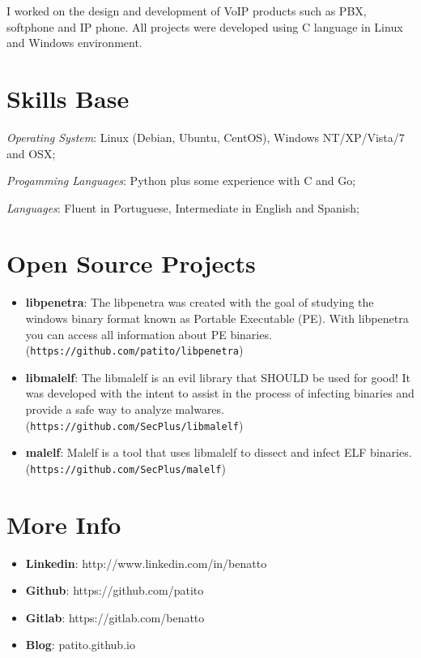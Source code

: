 \documentclass[margin]{res}
\begin{document}
\begin{resume}
    I worked on the design and development of VoIP products such as PBX, softphone and IP phone. 
    All projects were developed using C language in Linux and Windows environment.


\vspace{10mm}     

\section{Skills Base}  \textit{Operating System}:  Linux (Debian, Ubuntu, CentOS), Windows NT/XP/Vista/7 and OSX;
  
			\textit{Progamming Languages}: Python plus some experience with C and Go;
  
			\textit{Languages}: Fluent in Portuguese, Intermediate in English and Spanish;

\section{Open Source Projects}
		\begin{itemize}
		    \vspace{2mm}
		    \item \textbf{libpenetra}: The libpenetra was created with the goal of studying the windows binary format 
		                               known as Portable Executable (PE). With libpenetra you can access all information
		                               about PE binaries. (\texttt{https://github.com/patito/libpenetra}) \vspace{1mm}
		                               
		    \item \textbf{libmalelf}: The libmalelf is an evil library that SHOULD be used for good! It was developed
		                              with the intent to assist in the process of infecting binaries and provide a safe 
		                              way to analyze malwares. (\texttt{https://github.com/SecPlus/libmalelf})\vspace{1mm}
		                              
		    \item \textbf{malelf}: Malelf is a tool that uses libmalelf to dissect and infect ELF binaries. 
		                           (\texttt{https://github.com/SecPlus/malelf})
		\end{itemize}
 
\section{More Info}
    \begin{itemize}
        \item \textbf{Linkedin}: http://www.linkedin.com/in/benatto
        \item \textbf{Github}: https://github.com/patito
        \item \textbf{Gitlab}: https://gitlab.com/benatto
        \item \textbf{Blog}: patito.github.io
    \end{itemize}


\end{resume} 
\end{document}
